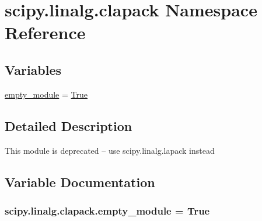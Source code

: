 \hypertarget{namespacescipy_1_1linalg_1_1clapack}{}\section{scipy.\+linalg.\+clapack Namespace Reference}
\label{namespacescipy_1_1linalg_1_1clapack}
\subsection*{Variables}
\begin{DoxyCompactItemize}
\item 
\hyperlink{namespacescipy_1_1linalg_1_1clapack_a92ab91775a1967836e868967a77fccd4}{empty\+\_\+module} = \hyperlink{libqhull_8h_add3ca9eefe3b5b754426f51d3043e579}{True}
\end{DoxyCompactItemize}


\subsection{Detailed Description}
\begin{DoxyVerb}This module is deprecated -- use scipy.linalg.lapack instead
\end{DoxyVerb}
 

\subsection{Variable Documentation}
\hypertarget{namespacescipy_1_1linalg_1_1clapack_a92ab91775a1967836e868967a77fccd4}{}
\subsubsection[{empty\+\_\+module}]{\setlength{\rightskip}{0pt plus 5cm}scipy.\+linalg.\+clapack.\+empty\+\_\+module = {\bf True}}\label{namespacescipy_1_1linalg_1_1clapack_a92ab91775a1967836e868967a77fccd4}
